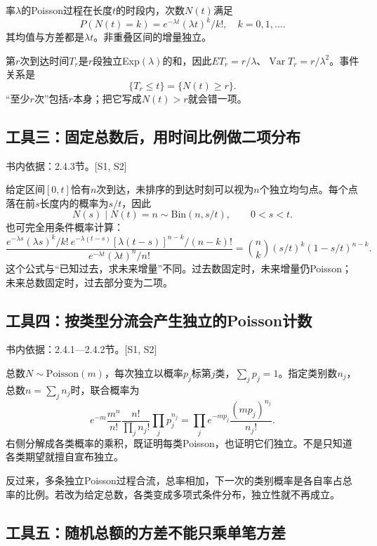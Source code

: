 \documentclass[
  11pt,
  a4paper,
  UTF8,fontset=fandol]{ctexart}
\let\OldSubsection\subsection
\renewcommand{\subsection}{\Needspace{5\baselineskip}\OldSubsection}
\begin{document}
率\(\lambda\)的Poisson过程在长度\(t\)的时段内，次数\(N(t)\)满足
\[P(N(t)=k)=e^{-\lambda t}(\lambda t)^k/k!,\quad k=0,1,\ldots.\]
其均值与方差都是\(\lambda t\)。非重叠区间的增量独立。

第\(r\)次到达时间\(T_r\)是\(r\)段独立Exp\((\lambda)\)的和，因此\(ET_r=r/\lambda\)、\(\operatorname{Var}T_r=r/\lambda^2\)。事件关系是
\[\{T_r\le t\}=\{N(t)\ge r\}.\]
``至少\(r\)次''包括\(r\)本身；把它写成\(N(t)>r\)就会错一项。

\subsection{工具三：固定总数后，用时间比例做二项分布}\label{ux5de5ux5177ux4e09ux56faux5b9aux603bux6570ux540eux7528ux65f6ux95f4ux6bd4ux4f8bux505aux4e8cux9879ux5206ux5e03}

书内依据：2.4.3节。{[}S1, S2{]}

给定区间\([0,t]\)恰有\(n\)次到达，未排序的到达时刻可以视为\(n\)个独立均匀点。每个点落在前\(s\)长度内的概率为\(s/t\)，因此
\[N(s)\mid N(t)=n\sim\mathrm{Bin}(n,s/t),\qquad0<s<t.\]
也可完全用条件概率计算：
\[\frac{e^{-\lambda s}(\lambda s)^k/k!\ e^{-\lambda(t-s)}[\lambda(t-s)]^{n-k}/(n-k)!}{e^{-\lambda t}(\lambda t)^n/n!}=\binom nk(s/t)^k(1-s/t)^{n-k}.\]
这个公式与``已知过去，求未来增量''不同。过去数固定时，未来增量仍Poisson；未来总数固定时，过去部分变为二项。

\subsection{工具四：按类型分流会产生独立的Poisson计数}\label{ux5de5ux5177ux56dbux6309ux7c7bux578bux5206ux6d41ux4f1aux4ea7ux751fux72ecux7acbux7684poissonux8ba1ux6570}

书内依据：2.4.1---2.4.2节。{[}S1, S2{]}

总数\(N\sim\mathrm{Poisson}(m)\)，每次独立以概率\(p_j\)标第\(j\)类，\(\sum_jp_j=1\)。指定类别数\(n_j\)，总数\(n=\sum_jn_j\)时，联合概率为
\[e^{-m}\frac{m^n}{n!}\frac{n!}{\prod_jn_j!}\prod_jp_j^{n_j}=\prod_j e^{-mp_j}\frac{(mp_j)^{n_j}}{n_j!}.\]
右侧分解成各类概率的乘积，既证明每类Poisson，也证明它们独立。不是只知道各类期望就擅自宣布独立。

反过来，多条独立Poisson过程合流，总率相加，下一次的类别概率是各自率占总率的比例。若改为给定总数，各类变成多项式条件分布，独立性就不再成立。

\subsection{工具五：随机总额的方差不能只乘单笔方差}\label{ux5de5ux5177ux4e94ux968fux673aux603bux989dux7684ux65b9ux5deeux4e0dux80fdux53eaux4e58ux5355ux7b14ux65b9ux5dee}
\end{document}
